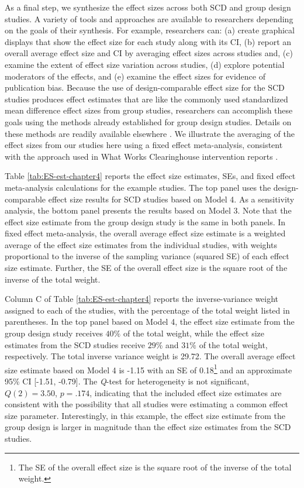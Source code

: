 \documentclass[
]{book}
\begin{document}
As a final step, we synthesize the effect sizes across both SCD and group design studies. A variety of tools and approaches are available to researchers depending on the goals of their synthesis. For example, researchers can: (a) create graphical displays that show the effect size for each study along with its CI, (b) report an overall average effect size and CI by averaging effect sizes across studies and, (c) examine the extent of effect size variation across studies, (d) explore potential moderators of the effects, and (e) examine the effect sizes for evidence of publication bias. Because the use of design-comparable effect size for the SCD studies produces effect estimates that are like the commonly used standardized mean difference effect sizes from group studies, researchers can accomplish these goals using the methods already established for group design studies.
Details on these methods are readily available elsewhere \citep[e.g.,][]{borenstein2021introduction, cooper2019handbook}. We illustrate the averaging of the effect sizes from our studies here using a fixed effect meta-analysis, consistent with the approach used in What Works Clearinghouse intervention reports \citep{whatworksclearinghouse2020What}.

Table \ref{tab:ES-est-chapter4} reports the effect size estimates, SEs, and fixed effect meta-analysis calculations for the example studies. The top panel uses the design-comparable effect size results for SCD studies based on Model 4. As a sensitivity analysis, the bottom panel presents the results based on Model 3. Note that the effect size estimate from the group design study is the same in both panels. In fixed effect meta-analysis, the overall average effect size estimate is a weighted average of the effect size estimates from the individual studies, with weights proportional to the inverse of the sampling variance (squared SE) of each effect size estimate. Further, the SE of the overall effect size is the square root of the inverse of the total weight.

Column C of Table \ref{tab:ES-est-chapter4} reports the inverse-variance weight assigned to each of the studies, with the percentage of the total weight listed in parentheses. In the top panel based on Model 4, the effect size estimate from the group design study receives \(40\%\) of the total weight, while the effect size estimates from the SCD studies receive \(29\%\) and \(31\%\) of the total weight, respectively. The total inverse variance weight is 29.72. The overall average effect size estimate based on Model 4 is -1.15 with an SE of 0.18\footnote{The SE of the overall effect size is the square root of the inverse of the total weight.} and an approximate 95\% CI {[}-1.51, -0.79{]}. The \emph{Q}-test for heterogeneity is not significant, \(Q(2) = 3.50\), \(p = .174\), indicating that the included effect size estimates are consistent with the possibility that all studies were estimating a common effect size parameter. Interestingly, in this example, the effect size estimate from the group design is larger in magnitude than the effect size estimates from the SCD studies.
\end{document}
